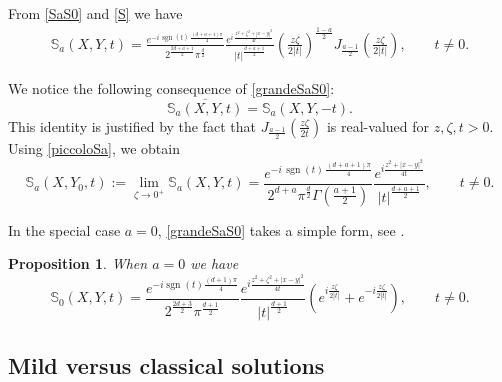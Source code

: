 \documentclass[11pt,letter]{amsart}
\numberwithin{equation}{section}
\newtheorem{proposition}[theorem]{Proposition}
\numberwithin{equation}{section}
\begin{document}
From \eqref{SaS0} and \eqref{S} we have
\begin{align}\label{grandeSaS0}
\mathbb S_a(X,Y,t)
= \frac{e^{-i\,\operatorname{sgn}(t)\,\frac{(d+a+1)\pi}{4}}}{2^{\frac{2d+a+1}{2}}\pi^{\frac d2}}  
\frac{e^{i\,\frac{z^2+\zeta^2+|x-y|^2}{4t}}}{|t|^{\frac{d+a+1}{2}}}\left(\frac{z\zeta}{2|t|}\right)^{\frac{1-a}{2}}
J_{\frac{a-1}{2}}\!\left(\frac{z\zeta}{2|t|}\right),
\qquad t\neq 0.
\end{align}







We notice the following consequence of \eqref{grandeSaS0}:
\begin{equation}\label{conj}
\overline{\mathbb S_a(X,Y,t)} = \mathbb S_a(X,Y,-t).
\end{equation}
This identity is justified by the fact that $J_{\frac{a-1}2}(\frac{z\zeta}{2t})$ is real-valued for $z, \zeta, t>0$. 
Using \eqref{piccoloSa}, we obtain
\begin{equation}\label{grandeSa}
\mathbb S_a(X,Y_0,t) :=\underset{\zeta\to 0^+}{\lim} \mathbb S_a(X,Y,t)
=
\frac{ e^{-i\,\operatorname{sgn}(t)\,\frac{(d+a+1)\pi}{4}}}{2^{d+a}\pi^{\frac d2}\Gamma\!\left(\frac{a+1}{2}\right)}
\frac{e^{i \frac{z^2+|x-y|^2}{4t}}}{|t|^{\frac{d+a+1}{2}}},
\qquad t\neq 0.
\end{equation}

In the special case $a=0$,  \eqref{grandeSaS0} takes a simple form, see \cite[Prop. 2.6]{GS}.

\begin{proposition}\label{P:azero}
When $a = 0$ we have
\[
\mathbb S_0(X,Y,t) = \frac{e^{-i\operatorname{sgn}(t)\frac{(d+1)\pi}{4}}}{2^{\frac{2d+3}{2}}\pi^{\frac{d+1}{2}}}
\frac{e^{i\frac{z^2+\zeta^2+|x-y|^2}{4t}}}{|t|^{\frac{d+1}{2}}}
\left(
e^{i\frac{z\zeta}{2|t|}} + e^{-i\frac{z\zeta}{2|t|}}
\right),
\qquad t\neq 0.
\]
\end{proposition}


 


\subsection{Mild versus classical solutions}
\end{document}
